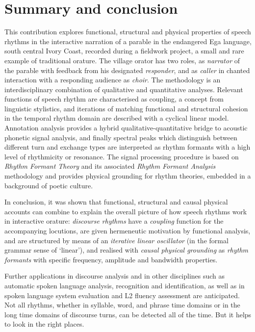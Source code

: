\documentclass[output=paper,colorlinks,citecolor=brown
]{langscibook}
\begin{document}
\section{Summary and conclusion}

This contribution explores functional, structural and physical properties of speech rhythms in the interactive narration of a parable in the endangered Ega language, south central Ivory Coast, recorded during a fieldwork project, a small and rare example of traditional orature. The village orator has two roles, as \textit{narrator} of the parable with feedback from his designated \textit{responder}, and as \textit{caller} in chanted interaction with a responding audience as \textit{choir}.  The methodology is an interdisciplinary combination of qualitative and quantitative analyses. Relevant functions of speech rhythm are characterised as coupling, a concept from linguistic stylistics, and iterations of matching functional and structural cohesion in the temporal rhythm domain are described with a cyclical linear model. Annotation analysis provides a hybrid qualitative-quantitative bridge to acoustic phonetic signal analysis, and finally spectral peaks which distinguish between different turn and exchange types are interpreted as rhythm formants with a high level of rhythmicity or resonance. The signal processing procedure is based on \textit{Rhythm Formant Theory} and its associated \textit{Rhythm Formant Analysis} methodology and provides physical grounding for rhythm theories, embedded in a background of poetic culture.

In conclusion, it was shown that functional, structural and causal physical accounts can combine to explain the overall picture of how speech rhythms work in interactive orature: \textit{discourse rhythms} have a \textit{coupling} function for the accompanying locutions, are given hermeneutic motivation by functional analysis, and are structured by means of an \textit{iterative linear oscillator} (in the formal grammar sense of `linear'), and realised with \textit{causal physical grounding} as \textit{rhythm formants} with specific frequency, amplitude and bandwidth properties.

Further applications in discourse analysis and in other disciplines such as automatic spoken language analysis, recognition and identification, as well as in spoken language system evaluation and L2 fluency assessment are anticipated. Not all rhythms, whether in syllable, word, and phrase time domains or in the long time domains of discourse turns, can be detected all of the time. But it helps to look in the right places.
\end{document}
